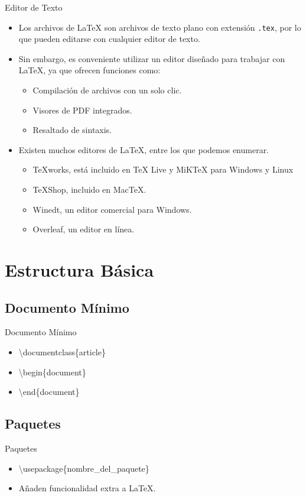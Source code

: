 \documentclass[12]{beamer}
\begin{document}
\begin{frame}{Editor de Texto}
  \begin{itemize}
    \item Los archivos de LaTeX son archivos de texto plano con extensión \texttt{.tex}, por lo que pueden editarse con cualquier editor de texto.
    \item<2-> Sin embargo, es conveniente utilizar un editor dise\~nado para trabajar con LaTeX, ya que ofrecen funciones como:
    \begin{itemize}
      \item<3-> Compilaci\'on de archivos con un solo clic.
      \item<4-> Visores de PDF integrados.
      \item<5-> Resaltado de sintaxis.
    \end{itemize}
    \item<6-> Existen muchos editores de LaTeX, entre los que podemos enumerar.
    \begin{itemize}
      \item<7-> TeXworks, est\'a incluido en TeX Live y MiKTeX para Windows y Linux
      \item<8-> TeXShop, incluido en MacTeX.
      \item<9-> Winedt, un editor comercial para Windows.
      \item<10-> Overleaf, un editor en l\'inea.
    \end{itemize}    
  \end{itemize}
\end{frame}

\section{Estructura Básica}
\subsection{Documento Mínimo}
\begin{frame}{Documento Mínimo}
  \begin{itemize}
    \item \textbackslash documentclass\{article\}
    \item \textbackslash begin\{document\}
    \item \textbackslash end\{document\}
  \end{itemize}
\end{frame}

\subsection{Paquetes}
\begin{frame}{Paquetes}
  \begin{itemize}
    \item \textbackslash usepackage\{nombre\_del\_paquete\}
    \item Añaden funcionalidad extra a LaTeX.
  \end{itemize}
\end{frame}
\end{document}
